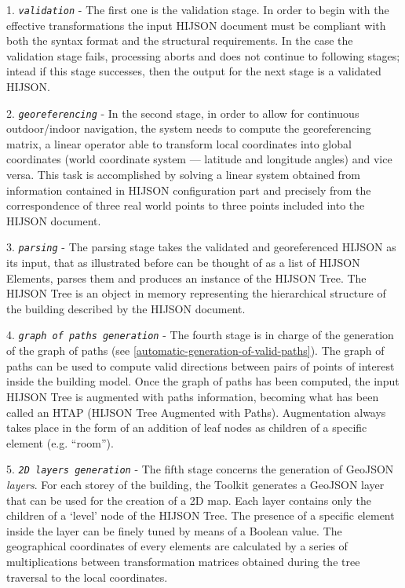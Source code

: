  1. \textit{\texttt{validation}} - The first one is the validation stage. In
  order to begin with the effective transformations the input HIJSON  document
  must be compliant with both the syntax format and the structural requirements.   In the
  case the validation stage fails, processing aborts and does not continue to
  following stages; intead if this stage successes, then the output for the next stage is a
  validated  HIJSON.

 2. \textit{\texttt{georeferencing}} - In the second stage, in order to allow
 for continuous outdoor/indoor navigation, the system needs to compute
 the georeferencing matrix, a linear operator able to transform local
 coordinates into global coordinates (world coordinate
 system --- latitude and longitude angles) and vice versa. This task is
 accomplished by solving a linear system obtained from information
 contained in HIJSON configuration part and precisely from the
 correspondence of three real world points to three points included
 into the HIJSON document.

 3. \textit{\texttt{parsing}} - The parsing stage takes the validated and
 georeferenced HIJSON as its input, that as illustrated before can be
 thought of as a list of HIJSON Elements, parses them and produces an
 instance of the HIJSON Tree. The HIJSON Tree is an object in memory
 representing the hierarchical structure of the building described
 by the HIJSON document.

 4. \textit{\texttt{graph of paths generation}} - The fourth stage is
 in charge  of the generation of the graph of paths 
 (see \ref{automatic-generation-of-valid-paths}). The graph of paths can
 be used to compute valid directions between pairs of points of  interest
 inside the building model. Once the graph of paths has been computed, the
 input HIJSON Tree is augmented with paths information, becoming what  has been
 called an HTAP (HIJSON Tree Augmented with Paths).  Augmentation always takes
 place in the form of an addition of leaf nodes as children of a  specific
 element (e.g. ``room'').

 5. \textit{\texttt{2D layers generation}} - The fifth stage concerns the
 generation of GeoJSON \emph{layers}. For each storey of the building, the Toolkit generates a
 GeoJSON layer that can be used for the creation of a 2D map. Each layer
 contains only the children of a `level' node of the HIJSON Tree. 
 The presence of a specific element inside the layer can be finely tuned 
 by means of a Boolean value. The geographical coordinates of every elements
 are calculated by a series of multiplications between transformation matrices obtained 
 during the tree traversal to the local coordinates.

